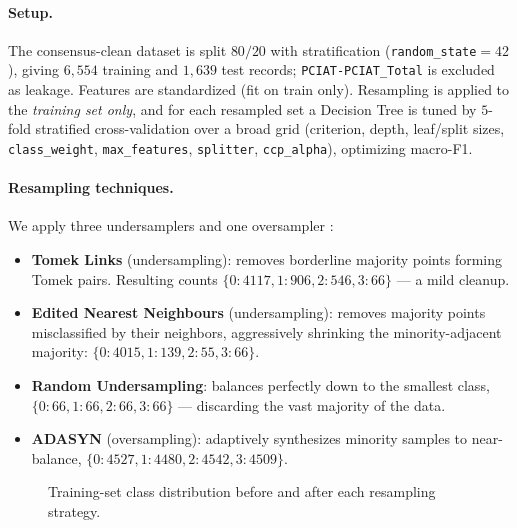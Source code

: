 \paragraph{Setup.} The consensus-clean dataset is split $80/20$ with stratification (\texttt{random\_state}$=42$), giving $6{,}554$ training and $1{,}639$ test records; \texttt{PCIAT-PCIAT\_Total} is excluded as leakage. Features are standardized (fit on train only). Resampling is applied to the \emph{training set only}, and for each resampled set a Decision Tree is tuned by $5$-fold stratified cross-validation over a broad grid (criterion, depth, leaf/split sizes, \texttt{class\_weight}, \texttt{max\_features}, \texttt{splitter}, \texttt{ccp\_alpha}), optimizing macro-F1.

\paragraph{Resampling techniques.} We apply three undersamplers and one oversampler \cite{imblearn,adasyn}:
\begin{itemize}
    \item \textbf{Tomek Links} (undersampling): removes borderline majority points forming Tomek pairs. Resulting counts $\{0{:}4117, 1{:}906, 2{:}546, 3{:}66\}$ --- a mild cleanup.
    \item \textbf{Edited Nearest Neighbours} (undersampling): removes majority points misclassified by their neighbors, aggressively shrinking the minority-adjacent majority: $\{0{:}4015, 1{:}139, 2{:}55, 3{:}66\}$.
    \item \textbf{Random Undersampling}: balances perfectly down to the smallest class, $\{0{:}66, 1{:}66, 2{:}66, 3{:}66\}$ --- discarding the vast majority of the data.
    \item \textbf{ADASYN} (oversampling): adaptively synthesizes minority samples to near-balance, $\{0{:}4527, 1{:}4480, 2{:}4542, 3{:}4509\}$.
\end{itemize}

\begin{figure}[h]
    \centering
    \caption{Training-set class distribution before and after each resampling strategy.}
    \label{fig:cmi_resample}
\end{figure}

